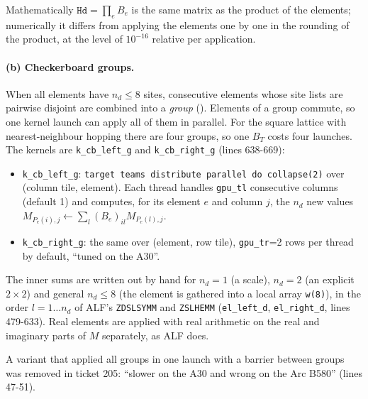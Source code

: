Mathematically $\texttt{Hd}=\prod_e B_e$ is the same matrix as the product of the elements; numerically it differs from applying the elements one by one in the rounding of the product, at the level of $10^{-16}$ relative per application.

\paragraph{(b) Checkerboard groups.} When all elements have $n_d\le8$ sites, consecutive elements whose site lists are pairwise disjoint are combined into a \emph{group} (). Elements of a group commute, so one kernel launch can apply all of them in parallel. For the square lattice with nearest-neighbour hopping there are four groups, so one $B_T$ costs four launches. The kernels are \texttt{k\_cb\_left\_g} and \texttt{k\_cb\_right\_g} (lines 638-669):
\begin{itemize}
\item \texttt{k\_cb\_left\_g}: \texttt{target teams distribute parallel do collapse(2)} over (column tile, element). Each thread handles \texttt{gpu\_tl} consecutive columns (default 1) and computes, for its element $e$ and column $j$, the $n_d$ new values $M_{P_e(i),j}\leftarrow\sum_l (B_e)_{il}M_{P_e(l),j}$.
\item \texttt{k\_cb\_right\_g}: the same over (element, row tile), \texttt{gpu\_tr}=2 rows per thread by default, ``tuned on the A30''.
\end{itemize}
The inner sums are written out by hand for $n_d=1$ (a scale), $n_d=2$ (an explicit $2\times2$) and general $n_d\le8$ (the element is gathered into a local array \texttt{w(8)}), in the order $l=1\ldots n_d$ of ALF's \texttt{ZDSLSYMM} and \texttt{ZSLHEMM} (\texttt{el\_left\_d}, \texttt{el\_right\_d}, lines 479-633). Real elements are applied with real arithmetic on the real and imaginary parts of $M$ separately, as ALF does.

A variant that applied all groups in one launch with a barrier between groups was removed in ticket 205: ``slower on the A30 and wrong on the Arc B580'' (lines 47-51).

